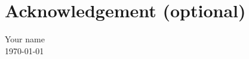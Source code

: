 \chapter*{Acknowledgement (optional)}
\begingroup
\justifying
\setlength{\parindent}{0pt}
\setlength{\parskip}{0.5\baselineskip}

\lipsum[1-2]

\begin{flushright}
Your name \\
\mydate\today
\end{flushright}

\endgroup